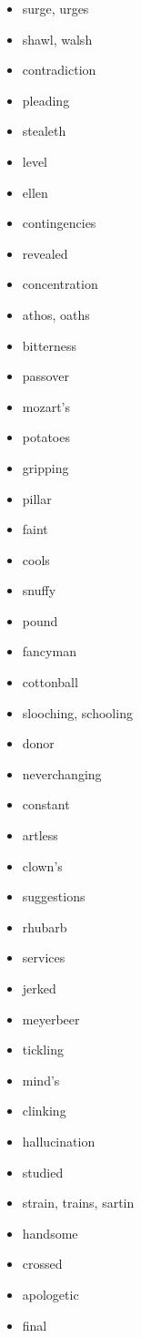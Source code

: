 \documentclass{article}
\begin{document}
\begin{itemize}
    \item surge, urges
    \item shawl, walsh
    \item contradiction
    \item pleading
    \item stealeth
    \item level
    \item ellen
    \item contingencies
    \item revealed
    \item concentration
    \item athos, oaths
    \item bitterness
    \item passover
    \item mozart's
    \item potatoes
    \item gripping
    \item pillar
    \item faint
    \item cools
    \item snuffy
    \item pound
    \item fancyman
    \item cottonball
    \item slooching, schooling
    \item donor
    \item neverchanging
    \item constant
    \item artless
    \item clown's
    \item suggestions
    \item rhubarb
    \item services
    \item jerked
    \item meyerbeer
    \item tickling
    \item mind's
    \item clinking
    \item hallucination
    \item studied
    \item strain, trains, sartin
    \item handsome
    \item crossed
    \item apologetic
    \item final

\end{itemize}
\end{document}
